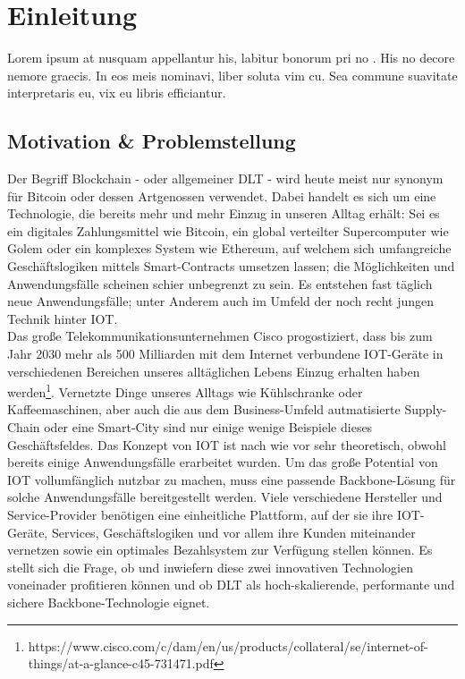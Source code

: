 \chapter{Einleitung}
\label{ch:intro}
Lorem ipsum at nusquam appellantur his, labitur bonorum pri no \citep{dueck:trio}. His no decore nemore graecis. In eos meis nominavi, liber soluta vim cu. Sea commune suavitate interpretaris eu, vix eu libris efficiantur.

%
%
\section{Motivation \& Problemstellung}
\label{sec:intro:motivation}
\lipsum[1-1]
Der Begriff Blockchain - oder allgemeiner \ac{DLT} - wird heute meist nur synonym für Bitcoin oder dessen Artgenossen verwendet. Dabei handelt es sich um eine Technologie, die bereits mehr und mehr Einzug in unseren Alltag erhält: Sei es ein digitales Zahlungsmittel wie Bitcoin, ein global verteilter Supercomputer wie Golem oder ein komplexes System wie Ethereum, auf welchem sich umfangreiche Geschäftslogiken mittels Smart-Contracts umsetzen lassen; die Möglichkeiten und Anwendungsfälle scheinen schier unbegrenzt zu sein. Es entstehen fast täglich neue Anwendungsfälle; unter Anderem auch im Umfeld der noch recht jungen Technik hinter \ac{IOT}.\\
Das große Telekommunikationsunternehmen Cisco progostiziert, dass bis zum Jahr 2030 mehr als 500 Milliarden mit dem Internet verbundene IOT-Geräte in verschiedenen Bereichen unseres alltäglichen Lebens Einzug erhalten haben werden\footnote{https://www.cisco.com/c/dam/en/us/products/collateral/se/internet-of-things/at-a-glance-c45-731471.pdf}. Vernetzte Dinge unseres Alltags wie Kühlschranke oder Kaffeemaschinen, aber auch die aus dem Business-Umfeld autmatisierte Supply-Chain oder eine Smart-City sind nur einige wenige Beispiele dieses Geschäftsfeldes. Das Konzept von IOT ist nach wie vor sehr theoretisch, obwohl bereits einige Anwendungsfälle erarbeitet wurden. Um das große Potential von IOT vollumfänglich nutzbar zu machen, muss eine passende Backbone-Lösung für solche Anwendungsfälle bereitgestellt werden. Viele verschiedene Hersteller und Service-Provider benötigen eine einheitliche Plattform, auf der sie ihre IOT-Geräte, Services, Geschäftslogiken und vor allem ihre Kunden miteinander vernetzen sowie ein optimales Bezahlsystem zur Verfügung stellen können. Es stellt sich die Frage, ob und inwiefern diese zwei innovativen Technologien voneinader profitieren können und ob \ac{DLT} als hoch-skalierende, performante und sichere Backbone-Technologie eignet.

